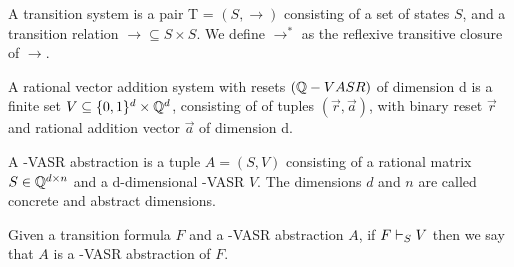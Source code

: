 \begin{mydef}
A transition system is a pair T = $(S, \rightarrow)$ consisting of a set of states $S$, and a transition relation $\rightarrow \subseteq S \times S$. We define $\rightarrow^*$ as the reflexive transitive closure of $\rightarrow$.
\end{mydef}

\begin{mydef}
A rational vector addition system with resets $(\mathbb{Q}-VASR)$ of dimension d is a finite set $V \subseteq \{0, 1\}^d \times \mathbb{Q}^d$, consisting of of tuples $(\vec{r}, \vec{a})$, with binary reset $\vec{r}$ and rational addition vector $\vec{a}$ of dimension d.
\end{mydef}

\begin{mydef}
A \Q-VASR abstraction is a tuple $A = (S, V)$ consisting of a rational matrix $S \in \mathbb{Q}^{d \times n}$ and a d-dimensional \Q-VASR $V$. The dimensions $d$ and $n$ are called concrete and abstract dimensions.
\end{mydef}

Given a transition formula $F$ and a \Q-VASR abstraction $A$, if $F \vdash_{S} V$ then we say that $A$ is a \Q-VASR abstraction of $F$.